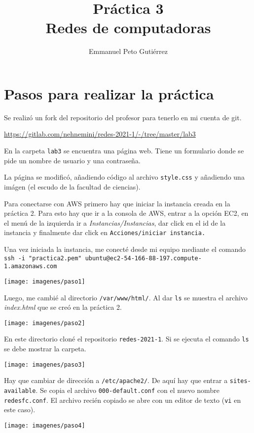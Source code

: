 \documentclass{article}
\title{Práctica 3\\Redes de computadoras}
\author{Emmanuel Peto Gutiérrez}
\begin{document}
\maketitle

\section{Pasos para realizar la práctica}

Se realizó un fork del repositorio del profesor para tenerlo en mi cuenta de git.

\url{https://gitlab.com/nehnemini/redes-2021-1/-/tree/master/lab3}

En la carpeta \texttt{lab3} se encuentra una página web. Tiene un formulario donde se pide un nombre de usuario y una contraseña.

La página se modificó, añadiendo código al archivo \texttt{style.css} y añadiendo una imágen (el escudo de la facultad de ciencias).

Para conectarse con AWS primero hay que iniciar la instancia creada en la práctica 2. Para esto hay que ir a la consola de AWS, entrar a la opción EC2, en el menú de la izquierda ir a \textit{Instancias/Instancias}, dar click en el id de la instancia y finalmente dar click en \texttt{Acciones/iniciar instancia.}

Una vez iniciada la instancia, me conecté desde mi equipo mediante el comando \texttt{ssh -i "practica2.pem" ubuntu@ec2-54-166-88-197.compute-1.amazonaws.com}

\texttt{[image: imagenes/paso1]}

Luego, me cambié al directorio \texttt{/var/www/html/}. Al dar \texttt{ls} se muestra el archivo \textit{index.html} que se creó en la práctica 2.

\texttt{[image: imagenes/paso2]}

En este directorio cloné el repositorio \texttt{redes-2021-1}. Si se ejecuta el comando \texttt{ls} se debe mostrar la carpeta.

\texttt{[image: imagenes/paso3]}

Hay que cambiar de dirección a \texttt{/etc/apache2/}. De aquí hay que entrar a \texttt{sites-available}. Se copia el archivo \texttt{000-default.conf} con el nuevo nombre \texttt{redesfc.conf}. El archivo recién copiado se abre con un editor de texto (\texttt{vi} en este caso).

\texttt{[image: imagenes/paso4]}
\end{document}
